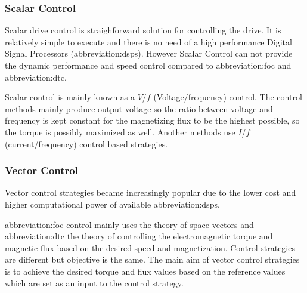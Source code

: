 \documentclass[a4paper, twoside, 11pt]{article}
\begin{document}
        \subsubsection{Scalar Control}
            Scalar drive control is straighforward solution for controlling the drive. It is relatively simple to execute and there is no need of a high performance Digital Signal Processors (\gls{abbreviation:dsp}s). However Scalar Control can not provide the dynamic performance and speed control compared to \gls{abbreviation:foc} and \gls{abbreviation:dtc}. \cite{dwivedi-review-on-control-strategies-of-permanent-magnet-assisted-synchronous-reluctance-motor-drive}\par
            Scalar control is mainly known as a $V$/$f$ (Voltage/frequency) control. The control methods mainly produce output voltage so the ratio between voltage and frequency is kept constant for the magnetizing flux to be the highest possible, so the torque is possibly maximized as well. Another methods use $I$/$f$ (current/frequency) control based strategies. \cite{heidari-a-review-of-synchronour-relucatence-motor-drive-advancements}

        \subsubsection{Vector Control}
            Vector control strategies became increasingly popular due to the lower cost and higher computational power of available \gls{abbreviation:dsp}s. \cite{dwivedi-review-on-control-strategies-of-permanent-magnet-assisted-synchronous-reluctance-motor-drive}
            \par
            \gls{abbreviation:foc} control mainly uses the theory of space vectors and \gls{abbreviation:dtc} the theory of controlling the electromagnetic torque and magnetic flux based on the desired speed and magnetization. Control strategies are different but objective is the same. The main aim of vector control strategies is to achieve the desired torque and flux values based on the reference values which are set as an input to the control strategy. \cite{heidari-a-review-of-synchronour-relucatence-motor-drive-advancements, dwivedi-review-on-control-strategies-of-permanent-magnet-assisted-synchronous-reluctance-motor-drive}
            
\end{document}

